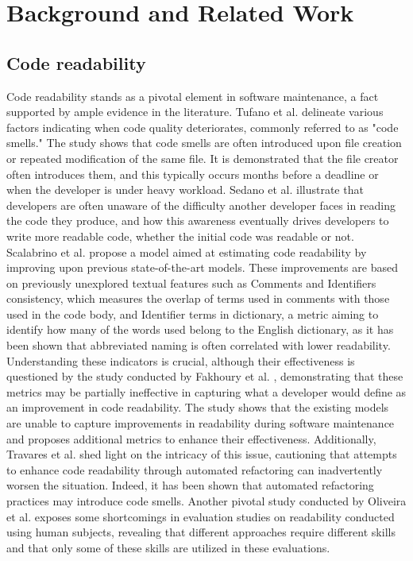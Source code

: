 \chapter{Background and Related Work}
\label{Chapter2}


\section{Code readability}

Code readability stands as a pivotal element in software maintenance, a fact supported by ample evidence in the literature. Tufano et al. \cite{Tufano2015} delineate various factors indicating when code quality deteriorates, commonly referred to as "code smells." The study shows that code smells are often introduced upon file creation or repeated modification of the same file. It is demonstrated that the file creator often introduces them, and this typically occurs months before a deadline or when the developer is under heavy workload. Sedano et al. \cite{Sedano2016} illustrate that developers are often unaware of the difficulty another developer faces in reading the code they produce, and how this awareness eventually drives developers to write more readable code, whether the initial code was readable or not. Scalabrino et al. \cite{Scalabrino2018} propose a model aimed at estimating code readability by improving upon previous state-of-the-art models. These improvements are based on previously unexplored textual features such as Comments and Identifiers consistency, which measures the overlap of terms used in comments with those used in the code body, and Identifier terms in dictionary, a metric aiming to identify how many of the words used belong to the English dictionary, as it has been shown that abbreviated naming is often correlated with lower readability.\newline
Understanding these indicators is crucial, although their effectiveness is questioned by the study conducted by Fakhoury et al. \cite{Fakhoury2019}, demonstrating that these metrics may be partially ineffective in capturing what a developer would define as an improvement in code readability. The study shows that the existing models are unable to capture improvements in readability during software maintenance and proposes additional metrics to enhance their effectiveness. Additionally, Travares et al. \cite{Travares2020} shed light on the intricacy of this issue, cautioning that attempts to enhance code readability through automated refactoring can inadvertently worsen the situation. Indeed, it has been shown that automated refactoring practices may introduce code smells. Another pivotal study conducted by Oliveira et al. \cite{Oliviera2020} exposes some shortcomings in evaluation studies on readability conducted using human subjects, revealing that different approaches require different skills and that only some of these skills are utilized in these evaluations.

